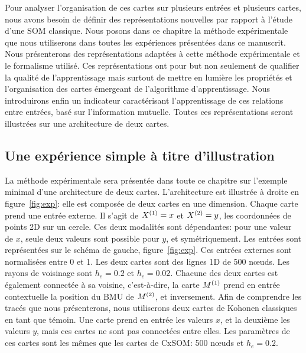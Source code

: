 Pour analyser l'organisation de ces cartes sur plusieurs entrées et plusieurs cartes, nous avons besoin de définir des représentations nouvelles par rapport à l'étude d'une SOM classique.
Nous posons dans ce chapitre la méthode expérimentale que nous utiliserons dans toutes les expériences présentées dans ce manuscrit. 
Nous présenterons des représentations adaptées à cette méthode expérimentale et le formalisme utilisé. Ces représentations ont pour but non seulement de qualifier la qualité de l'apprentissage mais surtout de mettre en lumière les propriétés et l'organisation des cartes émergeant de l'algorithme d'apprentissage.
Nous introduirons enfin un indicateur caractérisant l'apprentissage de ces relations entre entrées, basé sur l'information mutuelle. Toutes ces représentations seront illustrées sur une architecture de deux cartes.

\subsection{Une expérience simple à titre d'illustration}

La méthode expérimentale sera présentée dans toute ce chapitre sur l'exemple minimal d'une architecture de deux cartes. L'architecture est illustrée à droite en figure~\ref{fig:exp}: elle est composée de deux cartes en une dimension. Chaque carte prend une entrée externe. Il s'agit de $X^{({1})}=x$ et $X^{({2})}=y$, les coordonnées de points 2D sur un cercle. Ces deux modalités sont dépendantes: pour une valeur de $x$, seule deux valeurs sont possible pour $y$, et symétriquement. Les entrées sont représentées sur le schéma de gauche, figure~\ref{fig:exp}.
Ces entrées externes sont normalisées entre 0 et 1. Les deux cartes sont des lignes 1D de 500 n\oe{}uds. Les rayons de voisinage sont $h_e = 0.2$ et $h_c = 0.02$.
Chacune des deux cartes est également connectée à sa voisine, c'est-à-dire, la carte $M^{({1})}$ prend en entrée contextuelle la position du BMU de $M^{({2})}$, et inversement.
Afin de comprendre les tracés que nous présenterons, nous utiliserons deux cartes de Kohonen classiques en tant que témoin.
Une carte prend en entrée les valeurs $x$, et la deuxième les valeurs $y$, mais ces cartes ne sont pas connectées entre elles. Les paramètres de ces cartes sont les mêmes que les cartes de CxSOM: 500 n\oe{}uds et $h_e = 0.2$.

